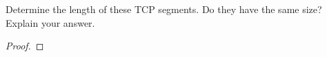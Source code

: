 \documentclass[../../main.tex]{subfiles}
\begin{document}
\begin{wts}
Determine the length of these TCP segments. Do they have the same size? Explain your answer.
\end{wts}
\begin{proof}

\end{proof}
\end{document}
